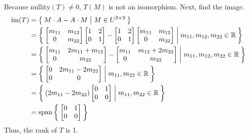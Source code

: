 \documentclass[letterpaper,12pt]{article}
\begin{document}
\begin{enumerate}
    Because $\text{nullity}(T) \ne 0$, $T(M)$ is not an isomorphism. Next, find the image.
\begin{align*}
      \text{im}(T) &= \Set{
        M \cdot A - A \cdot M
        | M \in U^{2 \times 2}
      } \\
      &= \Set{
        \begin{bmatrix}
          m_{11} & m_{12} \\
          0 & m_{22}
        \end{bmatrix}
        \begin{bmatrix}
          1 & 2 \\
          0 & 1
        \end{bmatrix}
        - \begin{bmatrix}
          1 & 2 \\
          0 & 1
        \end{bmatrix}
        \begin{bmatrix}
          m_{11} & m_{12} \\
          0 & m_{22}
        \end{bmatrix}
        | m_{11}, m_{12}, m_{22} \in \mathbb{R}
      } \\
      &= \Set{
        \begin{bmatrix}
          m_{11} & 2m_{11} + m_{12} \\
          0 & m_{22}
        \end{bmatrix} -
        \begin{bmatrix}
          m_{11} & m_{12} + 2m_{22} \\
          0 & m_{22}
        \end{bmatrix}
        | m_{11}, m_{12}, m_{22} \in \mathbb{R}
      } \\
      &= \Set{
        \begin{bmatrix}
          0 & 2m_{11} - 2m_{22} \\
          0 & 0
        \end{bmatrix}
        | m_{11}, m_{22} \in \mathbb{R}
      } \\
      &= \Set{
        (2m_{11} - 2m_{22})\begin{bmatrix}
          0 & 1 \\
          0 & 0
        \end{bmatrix}
        | m_{11}, m_{22} \in \mathbb{R}
      } \\
      &= \text{span}\Set{
        \begin{bmatrix}
          0 & 1 \\
          0 & 0
        \end{bmatrix}
      }
    \end{align*}
    Thus, the rank of $T$ is 1.
\end{enumerate}
\end{document}
